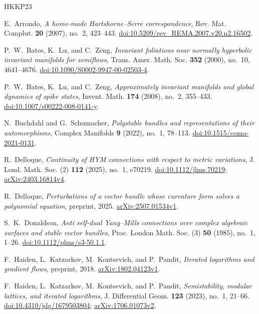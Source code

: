 \begin{thebibliography}{HKKP23}

E.~Arrondo, \emph{A home-made Hartshorne--Serre correspondence},
Rev. Mat. Complut. \textbf{20} (2007), no.~2, 423--443.
\href{https://doi.org/10.5209/rev_REMA.2007.v20.n2.16502}{doi:10.5209/rev\_REMA.2007.v20.n2.16502}.

P.~W.~Bates, K.~Lu, and C.~Zeng,
\emph{Invariant foliations near normally hyperbolic invariant manifolds for semiflows},
Trans. Amer. Math. Soc. \textbf{352} (2000), no.~10, 4641--4676.
\href{https://doi.org/10.1090/S0002-9947-00-02503-4}{doi:10.1090/S0002-9947-00-02503-4}.

P.~W.~Bates, K.~Lu, and C.~Zeng,
\emph{Approximately invariant manifolds and global dynamics of spike states},
Invent. Math. \textbf{174} (2008), no.~2, 355--433.
\href{https://doi.org/10.1007/s00222-008-0141-y}{doi:10.1007/s00222-008-0141-y}.

N.~Buchdahl and G.~Schumacher,
\emph{Polystable bundles and representations of their automorphisms},
Complex Manifolds \textbf{9} (2022), no.~1, 78--113.
\href{https://doi.org/10.1515/coma-2021-0131}{doi:10.1515/coma-2021-0131}.

R.~Delloque,
\emph{Continuity of HYM connections with respect to metric variations},
J. Lond. Math. Soc. (2) \textbf{112} (2025), no.~1, e70219.
\href{https://doi.org/10.1112/jlms.70219}{doi:10.1112/jlms.70219};
\href{https://arxiv.org/abs/2403.16814v4}{arXiv:2403.16814v4}.

R.~Delloque,
\emph{Perturbations of a vector bundle whose curvature form solves a polynomial equation},
preprint, 2025.
\href{https://arxiv.org/abs/2507.01534v1}{arXiv:2507.01534v1}.

S.~K.~Donaldson,
\emph{Anti self-dual Yang--Mills connections over complex algebraic surfaces and stable vector bundles},
Proc. London Math. Soc. (3) \textbf{50} (1985), no.~1, 1--26.
\href{https://doi.org/10.1112/plms/s3-50.1.1}{doi:10.1112/plms/s3-50.1.1}.

F.~Haiden, L.~Katzarkov, M.~Kontsevich, and P.~Pandit,
\emph{Iterated logarithms and gradient flows}, preprint, 2018.
\href{https://arxiv.org/abs/1802.04123v1}{arXiv:1802.04123v1}.

F.~Haiden, L.~Katzarkov, M.~Kontsevich, and P.~Pandit,
\emph{Semistability, modular lattices, and iterated logarithms},
J. Differential Geom. \textbf{123} (2023), no.~1, 21--66.
\href{https://doi.org/10.4310/jdg/1679503804}{doi:10.4310/jdg/1679503804};
\href{https://arxiv.org/abs/1706.01073v2}{arXiv:1706.01073v2}.


\end{thebibliography}
